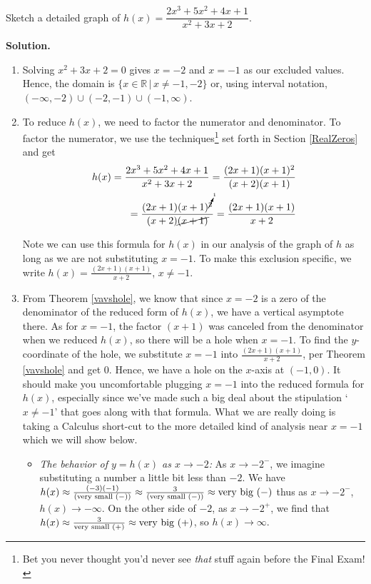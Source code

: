 \begin{ex}  Sketch a detailed graph of $h(x) = \dfrac{2x^3+5x^2+4x+1}{x^2+3x+2}$.

{ \bf Solution.}  

\begin{enumerate}

\item   Solving $x^2+3x+2 = 0$ gives $x = -2$ and $x=-1$ as our excluded values.  Hence, the domain is $\{ x \in \mathbb{R} \, | \, x \neq -1, -2 \}$ or, using interval notation,  $(-\infty, -2) \cup (-2, -1) \cup (-1, \infty)$.

\item  To reduce $h(x)$, we need to factor the numerator and denominator.  To factor the numerator, we use the techniques\footnote{Bet you never thought you'd never see \textit{that} stuff again before the Final Exam!} set forth in Section \ref{RealZeros} and get
\begin{align*}
h(x) =  \dfrac{2x^3+5x^2+4x+1}{x^2+3x+2} = \dfrac{(2x+1)(x+1)^2}{(x+2)(x+1)}\\
= \dfrac{ (2x+1) (x+1)^{\cancelto{1}{2}}  }{(x+2)\cancel{(x+1)}} = \dfrac{(2x+1)(x+1)}{x+2}
\end{align*}

Note we can use this formula for $h(x)$ in our analysis of the graph of $h$ as long as we are not substituting $x=-1$.  To make this exclusion specific, we write $h(x) = \frac{(2x+1)(x+1)}{x+2}$, $x \neq -1$.

\item  From Theorem \ref{vavshole}, we know that since $x=-2$ is a zero of the denominator of the reduced form of $h(x)$, we have a vertical asymptote there.  As for $x=-1$, the factor $(x+1)$ was canceled from the denominator when we reduced $h(x)$, so there will be a hole when $x=-1$.  To find the $y$-coordinate of the hole, we substitute $x=-1$ into $\frac{(2x+1)(x+1)}{x+2}$, per Theorem \ref{vavshole} and get $0$.  Hence, we have a hole on the $x$-axis at $(-1,0)$.  It should make you uncomfortable plugging $x=-1$ into the reduced formula for $h(x)$, especially since we've made such a big deal about the stipulation  `$x \neq -1$' that goes along with that formula.  What we are really doing is taking a Calculus short-cut to the more detailed kind of analysis near $x=-1$ which we will show below. 
\begin{itemize}

\item  \textit{The behavior of $y=h(x)$ as $x \rightarrow -2$:}  As $x \rightarrow -2^{-}$, we imagine substituting a number a little bit less than $-2$. We have $h(x) \approx \frac{(-3)(-1)}{(\text{\scriptsize very small $(-)$})} \approx \frac{3}{(\text{\scriptsize very small $(-)$})}\approx \text{very big $(-)$}$ thus as $x \rightarrow -2^{-}$, $h(x) \rightarrow -\infty$. On the other side of $-2$, as $x \rightarrow -2^{+}$, we find that $h(x) \approx \frac{3}{\text{\scriptsize very small $(+)$}} \approx \text{very big $(+)$}$, so $h(x) \rightarrow \infty$.


\end{itemize}
\end{enumerate}
\end{ex}
